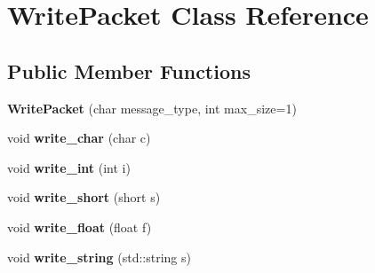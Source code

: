 \hypertarget{class_write_packet}{\section{Write\-Packet Class Reference}
\label{class_write_packet}
}
\subsection*{Public Member Functions}
\begin{DoxyCompactItemize}
\item 
\hypertarget{class_write_packet_aeac19c767326156d7c25747e396042b5}{{\bfseries Write\-Packet} (char message\-\_\-type, int max\-\_\-size=1)}\label{class_write_packet_aeac19c767326156d7c25747e396042b5}

\item 
\hypertarget{class_write_packet_a915f8d2b8715edbfe375c95ab2cdc891}{void {\bfseries write\-\_\-char} (char c)}\label{class_write_packet_a915f8d2b8715edbfe375c95ab2cdc891}

\item 
\hypertarget{class_write_packet_ab684b0f55e8dede898e13ce46c1d49db}{void {\bfseries write\-\_\-int} (int i)}\label{class_write_packet_ab684b0f55e8dede898e13ce46c1d49db}

\item 
\hypertarget{class_write_packet_a59548dc2e66dd2cd1a6cdcb5678d1308}{void {\bfseries write\-\_\-short} (short s)}\label{class_write_packet_a59548dc2e66dd2cd1a6cdcb5678d1308}

\item 
\hypertarget{class_write_packet_a0679dc68fb049c8bb0680bcdd3fbcf7d}{void {\bfseries write\-\_\-float} (float f)}\label{class_write_packet_a0679dc68fb049c8bb0680bcdd3fbcf7d}

\item 
\hypertarget{class_write_packet_a7c09c4008d359e2d7f56499a4c5ee5f6}{void {\bfseries write\-\_\-string} (std\-::string s)}\label{class_write_packet_a7c09c4008d359e2d7f56499a4c5ee5f6}

\end{DoxyCompactItemize}
